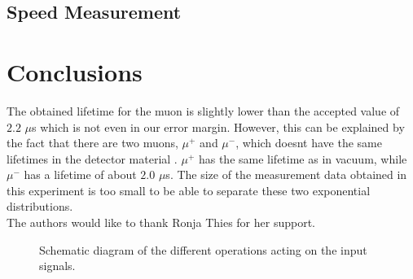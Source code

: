 \documentclass[10pt,twocolumn]{article}
\begin{document}
\subsection{Speed Measurement}


\section{Conclusions}
The obtained lifetime for the muon is slightly lower than the accepted value of $2.2$ $\mu$s which is not even in our error margin. However, this can be explained by the fact that there are two muons, $\mu^+$ and $\mu^-$, which doesnt have the same lifetimes in the detector material \cite{}. $\mu^+$ has the same lifetime as in vacuum, while $\mu^-$ has a lifetime of about $2.0$ $\mu$s. The size of the measurement data obtained in this experiment is too small to be able to separate these two exponential distributions.\\

The authors would like to thank Ronja Thies for her support.



\begin{figure}[h]

\caption{\label{setup} Schematic diagram of the different operations acting on the input signals.}
\end{figure}
\end{document}
